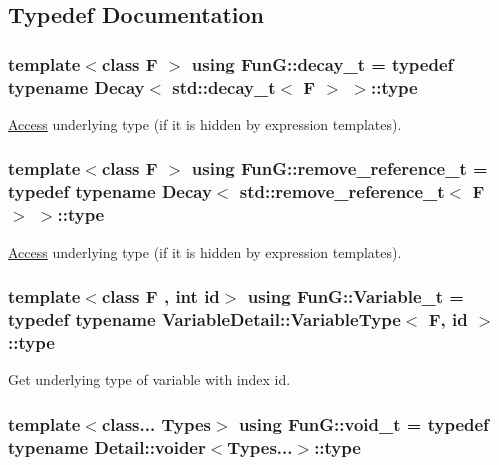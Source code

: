 \subsection{Typedef Documentation}
\hypertarget{namespaceFunG_a7ff91644f18a190ac3d4fc9e970ebe2e}{
\subsubsection[{decay\-\_\-t}]{\setlength{\rightskip}{0pt plus 5cm}template$<$class F $>$ using {\bf Fun\-G\-::decay\-\_\-t} = typedef typename {\bf Decay}$<$ std\-::decay\-\_\-t$<$ F $>$ $>$\-::type}}\label{namespaceFunG_a7ff91644f18a190ac3d4fc9e970ebe2e}


\hyperlink{namespaceFunG_1_1Access}{Access} underlying type (if it is hidden by expression templates). 

\hypertarget{namespaceFunG_a40f6d0896c1e3837d442d39418a4f609}{
\subsubsection[{remove\-\_\-reference\-\_\-t}]{\setlength{\rightskip}{0pt plus 5cm}template$<$class F $>$ using {\bf Fun\-G\-::remove\-\_\-reference\-\_\-t} = typedef typename {\bf Decay}$<$ std\-::remove\-\_\-reference\-\_\-t$<$ F $>$ $>$\-::type}}\label{namespaceFunG_a40f6d0896c1e3837d442d39418a4f609}


\hyperlink{namespaceFunG_1_1Access}{Access} underlying type (if it is hidden by expression templates). 

\hypertarget{namespaceFunG_afc90c0241d79dc4e02ffe640816ec94f}{
\subsubsection[{Variable\-\_\-t}]{\setlength{\rightskip}{0pt plus 5cm}template$<$class F , int id$>$ using {\bf Fun\-G\-::\-Variable\-\_\-t} = typedef typename Variable\-Detail\-::\-Variable\-Type$<$ F, id $>$\-::type}}\label{namespaceFunG_afc90c0241d79dc4e02ffe640816ec94f}


Get underlying type of variable with index id. 

\hypertarget{namespaceFunG_a0cde667596590eb8d32e4a5ee76ddbb9}{
\subsubsection[{void\-\_\-t}]{\setlength{\rightskip}{0pt plus 5cm}template$<$class... Types$>$ using {\bf Fun\-G\-::void\-\_\-t} = typedef typename Detail\-::voider$<$Types...$>$\-::type}}\label{namespaceFunG_a0cde667596590eb8d32e4a5ee76ddbb9}


